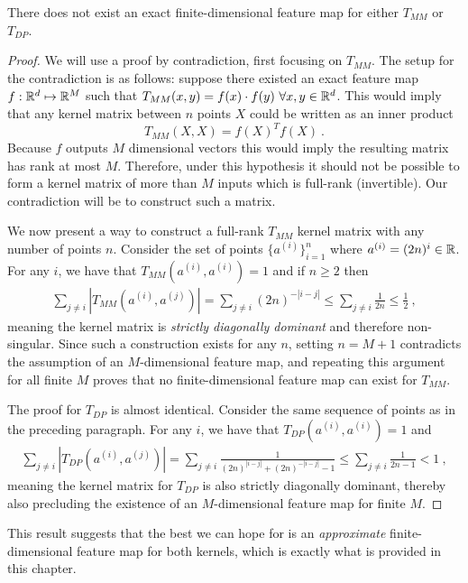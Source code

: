 \begin{lemma}
    There does not exist an exact finite-dimensional feature map for either $T_{MM}$ or $T_{DP}$.
\end{lemma}
\begin{proof}
    We will use a proof by contradiction, first focusing on $T_{MM}$.
    The setup for the contradiction is as follows: suppose there existed an exact feature map
    $f:\mathbb{R}^d\mapsto\mathbb{R}^M$
    such that $T_{MM}(x,y)=f(x)\cdot f(y)\ \forall x,y\in\mathbb{R}^d$.
    This would imply that any kernel matrix between $n$ points $X$
    could be written as an inner product
    \begin{equation*}
        T_{MM}(X,X)=f(X)^T f(X) \ .
    \end{equation*}
    Because $f$ outputs $M$ dimensional vectors this would imply the resulting matrix has rank at most $M$.
    Therefore, under this hypothesis it should not be possible to form a kernel matrix of more than $M$ inputs which is full-rank (invertible). Our contradiction will be to construct such a matrix.

    We now present a way to construct a full-rank $T_{MM}$ kernel matrix with any number of points $n$.
    Consider the set of points $\{a^{(i)}\}_{i=1}^n$ where $a^{(i)}= (2n)^i \in \mathbb{R}$.
    For any $i$, we have that $T_{MM}(a^{(i)}, a^{(i)})=1$
    and if $n\geq 2$ then
    \begin{align*}
        \sum_{j\neq i} | T_{MM}(a^{(i)}, a^{(j)}) | = \sum_{j\neq i} (2n)^{-|i-j|} \leq \sum_{j\neq i} \frac{1}{2n} \leq \frac{1}{2}\ ,
    \end{align*}
    meaning the kernel matrix is \emph{strictly diagonally dominant} and therefore non-singular.
    Since such a construction exists for any $n$,
    setting $n=M+1$ contradicts the assumption of an $M$-dimensional feature map, and repeating this argument for all finite $M$ proves that no finite-dimensional feature map can exist for $T_{MM}$.

    The proof for $T_{DP}$ is almost identical.
    Consider the same sequence of points as in the preceding paragraph.
    For any $i$, we have that $T_{DP}(a^{(i)}, a^{(i)})=1$ and
    \begin{align*}
        \sum_{j\neq i} | T_{DP}(a^{(i)}, a^{(j)}) | = \sum_{j\neq i} \frac{1}{(2n)^{|i-j|} + (2n)^{-|i-j|} - 1} \leq \sum_{j\neq i} \frac{1}{2n-1} < 1\ ,
    \end{align*}
    meaning the kernel matrix for $T_{DP}$ is also strictly diagonally dominant,
    thereby also precluding the existence of an $M$-dimensional feature map for finite $M$.


\end{proof}

This result suggests that the best we can hope for is an \emph{approximate} finite-dimensional feature map for both kernels,
which is exactly what is provided in this chapter.
